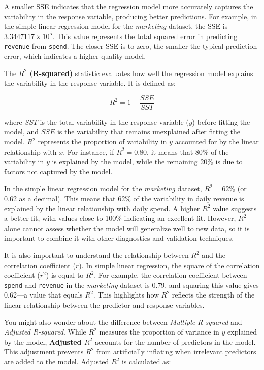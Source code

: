 \documentclass[
]{book}
\newcommand{\passthrough}[1]{#1}
\theoremstyle{definition}
\theoremstyle{definition}
\theoremstyle{definition}
\theoremstyle{definition}
\theoremstyle{remark}
\begin{document}
A smaller SSE indicates that the regression model more accurately captures the variability in the response variable, producing better predictions. For example, in the simple linear regression model for the \emph{marketing} dataset, the SSE is \ensuremath{3.3447117\times 10^{5}}. This value represents the total squared error in predicting \passthrough{\lstinline!revenue!} from \passthrough{\lstinline!spend!}. The closer SSE is to zero, the smaller the typical prediction error, which indicates a higher-quality model.

The \textbf{\(R^2\) (R-squared)} statistic evaluates how well the regression model explains the variability in the response variable. It is defined as:

\[
R^2 = 1 - \frac{SSE}{SST}
\]

where \(SST\) is the total variability in the response variable (\(y\)) before fitting the model, and \(SSE\) is the variability that remains unexplained after fitting the model. \(R^2\) represents the proportion of variability in \(y\) accounted for by the linear relationship with \(x\). For instance, if \(R^2 = 0.80\), it means that 80\% of the variability in \(y\) is explained by the model, while the remaining 20\% is due to factors not captured by the model.

In the simple linear regression model for the \emph{marketing} dataset, \(R^2 = 62\)\% (or 0.62 as a decimal). This means that 62\% of the variability in daily revenue is explained by the linear relationship with daily spend. A higher \(R^2\) value suggests a better fit, with values close to 100\% indicating an excellent fit. However, \(R^2\) alone cannot assess whether the model will generalize well to new data, so it is important to combine it with other diagnostics and validation techniques.

It is also important to understand the relationship between \(R^2\) and the correlation coefficient (\(r\)). In simple linear regression, the square of the correlation coefficient (\(r^2\)) is equal to \(R^2\). For example, the correlation coefficient between \passthrough{\lstinline!spend!} and \passthrough{\lstinline!revenue!} in the \emph{marketing} dataset is 0.79, and squaring this value gives 0.62---a value that equals \(R^2\). This highlights how \(R^2\) reflects the strength of the linear relationship between the predictor and response variables.

You might also wonder about the difference between \emph{Multiple R-squared} and \emph{Adjusted R-squared}. While \(R^2\) measures the proportion of variance in \(y\) explained by the model, \textbf{Adjusted \(R^2\)} accounts for the number of predictors in the model. This adjustment prevents \(R^2\) from artificially inflating when irrelevant predictors are added to the model. Adjusted \(R^2\) is calculated as:
\end{document}
